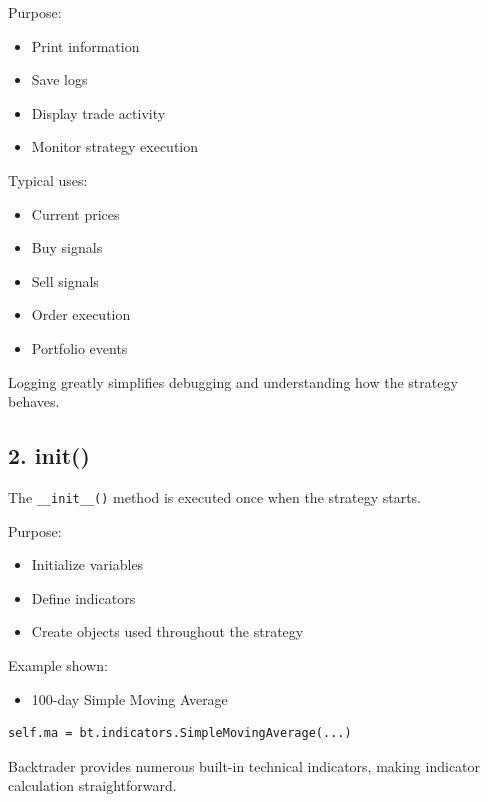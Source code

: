 \documentclass[12pt,openany]{book}
\begin{document}
Purpose:

\begin{itemize}[leftmargin=*]
    \item Print information
    \item Save logs
    \item Display trade activity
    \item Monitor strategy execution
\end{itemize}

Typical uses:

\begin{itemize}[leftmargin=*]
    \item Current prices
    \item Buy signals
    \item Sell signals
    \item Order execution
    \item Portfolio events
\end{itemize}

Logging greatly simplifies debugging and understanding how the strategy behaves.

\subsection{2. init()}

The \texttt{\_\_init\_\_()} method is executed once when the strategy starts.

Purpose:

\begin{itemize}[leftmargin=*]
    \item Initialize variables
    \item Define indicators
    \item Create objects used throughout the strategy
\end{itemize}

Example shown:

\begin{itemize}[leftmargin=*]
    \item 100-day Simple Moving Average
\end{itemize}

\begin{Verbatim}[breaklines=true,breakanywhere=true,fontsize=\small]
self.ma = bt.indicators.SimpleMovingAverage(...)
\end{Verbatim}

Backtrader provides numerous built-in technical indicators, making indicator calculation straightforward.
\end{document}
